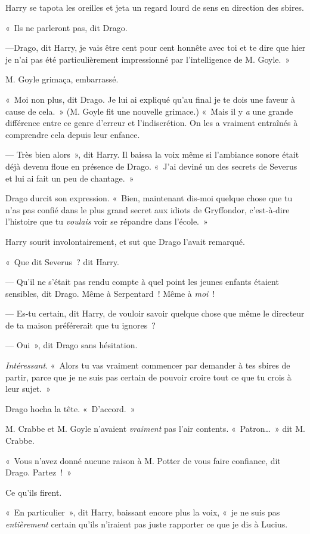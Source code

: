 Harry se tapota les oreilles et jeta un regard lourd de sens en direction des sbires.

«~Ils ne parleront pas, dit Drago.

---Drago, dit Harry, je vais être cent pour cent honnête avec toi et te dire que hier je n'ai pas été particulièrement impressionné par l'intelligence de M. Goyle.~»

M. Goyle grimaça, embarrassé.

«~Moi non plus, dit Drago.
Je lui ai expliqué qu'au final je te dois une faveur à cause de cela.~»
(M. Goyle fit une nouvelle grimace.)
«~Mais il y \emph{a} une grande différence entre ce genre d'erreur et l'indiscrétion.
On les a vraiment entraînés à comprendre cela depuis leur enfance.

--- Très bien alors~», dit Harry.
Il baissa la voix même si l'ambiance sonore était déjà devenu floue en présence de Drago.
«~J'ai deviné un des secrets de Severus et lui ai fait un peu de chantage.~»

Drago durcit son expression.
«~Bien, maintenant dis-moi quelque chose que tu n'as pas confié dans le plus grand secret aux idiots de Gryffondor, c'est-à-dire l'histoire que tu \emph{voulais} voir se répandre dans l'école.~»

Harry sourit involontairement, et sut que Drago l'avait remarqué.

«~Que dit Severus~? dit Harry.

--- Qu'il ne s'était pas rendu compte à quel point les jeunes enfants étaient sensibles, dit Drago.
Même à Serpentard~!
Même à \emph{moi}~!

--- Es-tu certain, dit Harry, de vouloir savoir quelque chose que même le directeur de ta maison préférerait que tu ignores~?

--- Oui~», dit Drago sans hésitation.

\emph{Intéressant}.
«~Alors tu vas vraiment commencer par demander à tes sbires de partir, parce que je ne suis pas certain de pouvoir croire tout ce que tu crois à leur sujet.~»

Drago hocha la tête.
«~D'accord.~»

M. Crabbe et M. Goyle n'avaient \emph{vraiment} pas l'air contents.
«~Patron…~»
dit M. Crabbe.

«~Vous n'avez donné aucune raison à M. Potter de vous faire confiance, dit Drago.
Partez~!~»

Ce qu'ils firent.

«~En particulier~», dit Harry, baissant encore plus la voix, «~je ne suis pas \emph{entièrement} certain qu'ils n'iraient pas juste rapporter ce que je dis à Lucius.

